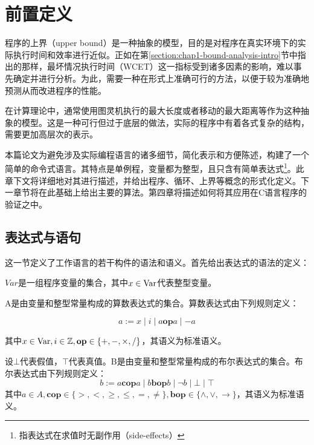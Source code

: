 
\chapter{前置定义}

程序的上界（upper bound）是一种抽象的模型，目的是对程序在真实环境下的实际执行时间和效率进行近似。正如在第\ref{section:chap1-bound-analysis-intro}节中指出的那样，最坏情况执行时间（WCET）这一指标受到诸多因素的影响，难以事先确定并进行分析。为此，需要一种在形式上准确可行的方法，以便于较为准确地预测从而改进程序的性能。

在计算理论中，通常使用图灵机执行的最大长度或者移动的最大距离等作为这种抽象的模型。这是一种可行但过于底层的做法，实际的程序中有着各式复杂的结构，需要更加高层次的表示。

本篇论文为避免涉及实际编程语言的诸多细节，简化表示和方便陈述，构建了一个简单的命令式语言。其特点是单例程，变量都为整型，且只含有简单表达式\footnote{指表达式在求值时无副作用（side-effects）}。此章下文将详细地对其进行描述，并给出程序、循环、上界等概念的形式化定义。下一章节将在此基础上给出主要的算法。第四章将描述如何将其应用在C语言程序的验证之中。

\section{表达式与语句}

这一节定义了工作语言的若干构件的语法和语义。首先给出表达式的语法的定义：

\begin{definition}
  $Var$是一组程序变量的集合，其中$x \in \operatorname{Var}$代表整型变量。
\end{definition}

\begin{definition}
  \label{def:chap2-arith-expr}
  
  A是由变量和整型常量构成的算数表达式的集合。算数表达式由下列规则定义：
  
  \[ 
  a := x \mid i \mid a \mathbin{\mathbf{op}} a \mid - a 
  \]
     
  其中$x \in \operatorname{Var}, i \in \mathbb{Z},  \mathbf{op} \in \{ +, -, \times, / \}$，其语义为标准语义。
\end{definition}

\begin{definition}
  设$\bot$代表假值，$\top$代表真值。B是由变量和整型常量构成的布尔表达式的集合。布尔表达式由下列规则定义：
  \[ b := a \mathbin{\mathbf{cop}} a \mid b \mathbin{\mathbf{bop}} b
     \mid \neg b \mid \bot \mid \top \]
  其中$a \in A, \mathbf{cop} \in \{ >, <, \geqslant, \leqslant,
  =, \neq \}, \mathbf{bop} \in \{ \wedge, \vee, \rightarrow
  \}$，其语义为标准语义。
\end{definition}

